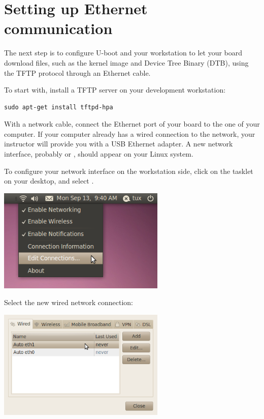 \section{Setting up Ethernet communication}

The next step is to configure U-boot and your workstation to let your
board download files, such as the kernel image and Device Tree Binary
(DTB), using the TFTP protocol through an Ethernet cable.

To start with, install a TFTP server on your development workstation:

\begin{verbatim}
sudo apt-get install tftpd-hpa
\end{verbatim}

With a network cable, connect the Ethernet port of your board to the
one of your computer. If your computer already has a wired connection
to the network, your instructor will provide you with a USB Ethernet
adapter. A new network interface, probably  or ,
should appear on your Linux system.

To configure your network interface on the workstation side, click on
the  tasklet on your desktop, and select
.

\begin{center}
\includegraphics[width=8cm]{labs/kernel-board-setup/network-config-1.png}
\end{center}

Select the new wired network connection:

\begin{center}
\includegraphics[width=8cm]{labs/kernel-board-setup/network-config-2.png}
\end{center}


